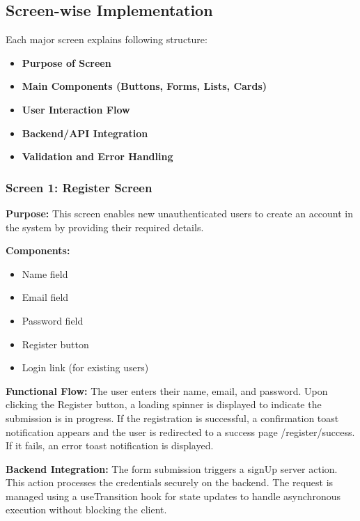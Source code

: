 
\subsection{Screen-wise Implementation}

Each major screen explains following structure:

\begin{itemize}
    \item \textbf{Purpose of Screen}
    \item \textbf{Main Components (Buttons, Forms, Lists, Cards)}
    \item \textbf{User Interaction Flow}
    \item \textbf{Backend/API Integration}
    \item \textbf{Validation and Error Handling}
\end{itemize}


\subsubsection{Screen 1: Register Screen}

\textbf{Purpose:}
This screen enables new unauthenticated users to create an account in the system by providing their required details.

\textbf{Components:}
\begin{itemize}
    \item Name field
    \item Email field
    \item Password field
    \item Register button
    \item Login link (for existing users)
\end{itemize}

\textbf{Functional Flow:} The user enters their name, email, and password. Upon clicking the Register button, a loading spinner is displayed to indicate the submission is in progress. If the registration is successful, a confirmation toast notification appears and the user is redirected to a success page /register/success. If it fails, an error toast notification is displayed.

\textbf{Backend Integration:} The form submission triggers a signUp server action. This action processes the credentials securely on the backend. The request is managed using a useTransition hook for state updates to handle asynchronous execution without blocking the client.

